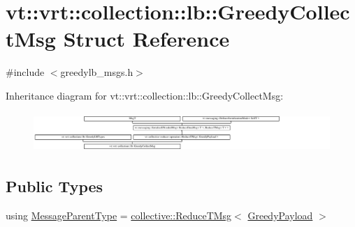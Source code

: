 \hypertarget{structvt_1_1vrt_1_1collection_1_1lb_1_1_greedy_collect_msg}{}\section{vt\+:\+:vrt\+:\+:collection\+:\+:lb\+:\+:Greedy\+Collect\+Msg Struct Reference}
\label{structvt_1_1vrt_1_1collection_1_1lb_1_1_greedy_collect_msg}


{\ttfamily \#include $<$greedylb\+\_\+msgs.\+h$>$}

Inheritance diagram for vt\+:\+:vrt\+:\+:collection\+:\+:lb\+:\+:Greedy\+Collect\+Msg\+:\begin{figure}[H]
\begin{center}
\leavevmode
\includegraphics[height=1.533196cm]{structvt_1_1vrt_1_1collection_1_1lb_1_1_greedy_collect_msg}
\end{center}
\end{figure}
\subsection*{Public Types}
\begin{DoxyCompactItemize}
\item 
using \hyperlink{structvt_1_1vrt_1_1collection_1_1lb_1_1_greedy_collect_msg_a6e6be2a54d20566764aec3bb66d93c1e}{Message\+Parent\+Type} = \hyperlink{namespacevt_1_1collective_a28b82d5d48c9bc6e4fd738fcbf9e0f62}{collective\+::\+Reduce\+T\+Msg}$<$ \hyperlink{structvt_1_1vrt_1_1collection_1_1lb_1_1_greedy_payload}{Greedy\+Payload} $>$
\end{DoxyCompactItemize}
